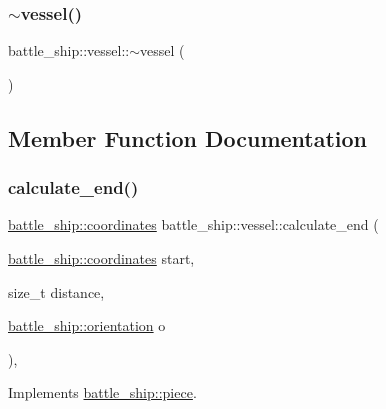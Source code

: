 \mbox{\label{classbattle__ship_1_1vessel_a281821b204a7fb93071ef75de5685a37}} 
\subsubsection{\texorpdfstring{$\sim$vessel()}{~vessel()}}
{\footnotesize\ttfamily battle\+\_\+ship\+::vessel\+::$\sim$vessel (\begin{DoxyParamCaption}{ }\end{DoxyParamCaption})\hspace{0.3cm}{\ttfamily [default]}}



\subsection{Member Function Documentation}
\mbox{\label{classbattle__ship_1_1vessel_a9b99c5ed2629203985b25338df585234}} 
\subsubsection{\texorpdfstring{calculate\+\_\+end()}{calculate\_end()}}
{\footnotesize\ttfamily \hyperlink{structbattle__ship_1_1coordinates}{battle\+\_\+ship\+::coordinates} battle\+\_\+ship\+::vessel\+::calculate\+\_\+end (\begin{DoxyParamCaption}\item[{\hyperlink{structbattle__ship_1_1coordinates}{battle\+\_\+ship\+::coordinates}}]{start,  }\item[{size\+\_\+t}]{distance,  }\item[{\hyperlink{namespacebattle__ship_aed87488f0a73f0d0679fe343fb61c784}{battle\+\_\+ship\+::orientation}}]{o }\end{DoxyParamCaption})\hspace{0.3cm}{\ttfamily [override]}, {\ttfamily [virtual]}}



Implements \hyperlink{classbattle__ship_1_1piece_a58092f7b1d663471204d7e51e68bbb2d}{battle\+\_\+ship\+::piece}.



